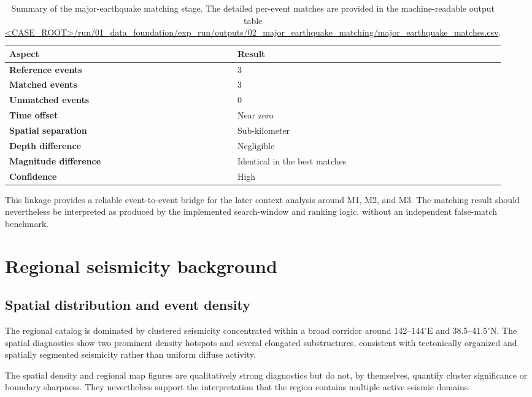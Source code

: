 \documentclass[11pt]{article}
\begin{document}
\begin{table}[H]
\centering
\caption{Summary of the major-earthquake matching stage. The detailed per-event matches are provided in the machine-readable output table \url{<CASE_ROOT>/run/01_data_foundation/exp_run/outputs/02_major_earthquake_matching/major_earthquake_matches.csv}.}
\begin{tabularx}{\textwidth}{>{\bfseries}l X}
\toprule
Aspect & Result \\
\midrule
Reference events & 3 \\
Matched events & 3 \\
Unmatched events & 0 \\
Time offset & Near zero \\
Spatial separation & Sub-kilometer \\
Depth difference & Negligible \\
Magnitude difference & Identical in the best matches \\
Confidence & High \\
\bottomrule
\end{tabularx}
\end{table}

This linkage provides a reliable event-to-event bridge for the later context analysis around M1, M2, and M3. The matching result should nevertheless be interpreted as produced by the implemented search-window and ranking logic, without an independent false-match benchmark.

\section{Regional seismicity background}
\subsection{Spatial distribution and event density}
The regional catalog is dominated by clustered seismicity concentrated within a broad corridor around 142--144$^{\circ}$E and 38.5--41.5$^{\circ}$N. The spatial diagnostics show two prominent density hotspots and several elongated substructures, consistent with tectonically organized and spatially segmented seismicity rather than uniform diffuse activity.

The spatial density and regional map figures are qualitatively strong diagnostics but do not, by themselves, quantify cluster significance or boundary sharpness. They nevertheless support the interpretation that the region contains multiple active seismic domains.
\end{document}
